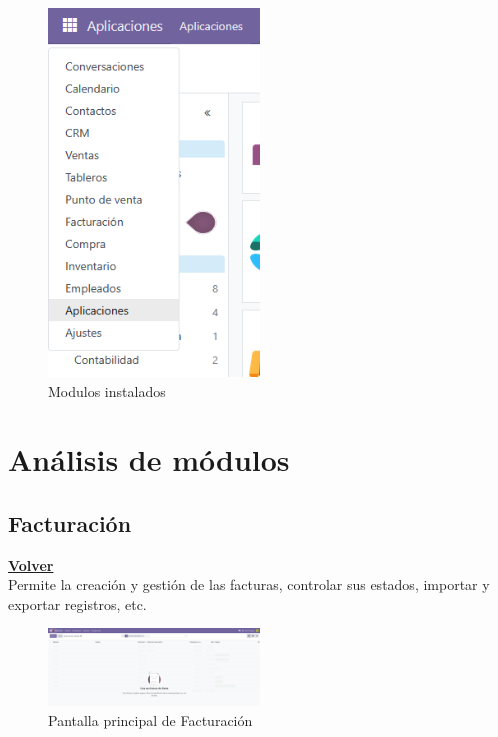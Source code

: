 \documentclass[a4paper,12pt]{article}
\begin{document}
\begin{figure}[h!]
    \centering
    \includegraphics[width=0.5\textwidth]{pr2odoo01-modulosInstalados.png}
    \caption{Modulos instalados}
\end{figure}
\FloatBarrier

\section{Análisis de módulos}

\subsection{Facturación}
\hyperlink{anchor-indice}{\textbf{Volver}}\\

Permite la creación y gestión de las facturas, controlar sus estados, importar y exportar registros, etc.

\begin{figure}[h!]
    \centering
    \includegraphics[width=0.5\textwidth]{pr2odoo02-facturacMain.png}
    \caption{Pantalla principal de Facturación}
\end{figure}
\FloatBarrier
\end{document}
